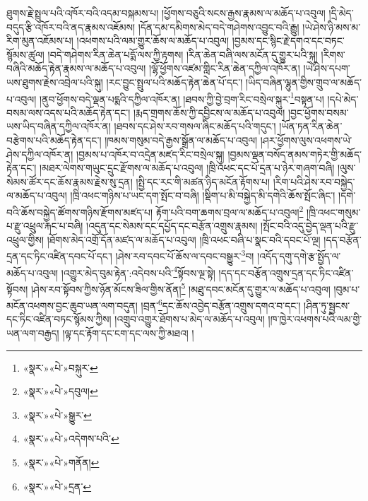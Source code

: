 ཐུགས་རྗེ་སྤྲུལ་པའི་འཁོར་བའི་འདམ་བསྐམས་པ། །ཕྱོགས་བཅུའི་སངས་རྒྱས་རྣམས་ལ་མཆོད་པ་འབུལ། །དྲི་མེད་བདུད་རྩི་འཁོར་བའི་ནད་རྣམས་འཇོམས། །དོན་དམ་དམིགས་མེད་བདེ་གཤེགས་འབྱུང་བའི་རྒྱུ། །ཡེ་ཤེས་ཉི་མས་མ་རིག་མུན་འཇོམས་པ། །འཕགས་པའི་ལམ་གྱུར་ཆོས་ལ་མཆོད་པ་འབུལ། །བྱམས་དང་སྙིང་རྗེ་དགའ་དང་བཏང་སྙོམས་ཚུལ། །བདེ་གཤེགས་རིན་ཆེན་པདྨོ་ལས་ཀྱི་རྟགས། །རིན་ཆེན་བཞི་ལས་མངོན་དུ་གྱུར་པའི་སྐུ། །རིགས་བཞིའི་མཆོད་རྟེན་རྣམས་ལ་མཆོད་པ་འབུལ། །ལྷོ་ཕྱོགས་འཛམ་གླིང་རིན་ཆེན་དཀྱིལ་འཁོར་ན། །ཡེ་ཤེས་དཔག་ཡས་ཐུགས་རྗེས་འབྲེལ་པའི་སྐུ། །རང་བྱུང་སྤྲུལ་པའི་མཆོད་རྟེན་ཆེན་པོ་དང་། །ཡིད་བཞིན་ལྷུན་གྱིས་གྲུབ་ལ་མཆོད་པ་འབུལ། །ནུབ་ཕྱོགས་བདེ་ལྡན་པདྨའི་དཀྱིལ་འཁོར་ན། །ཐབས་ཀྱི་བྱེ་བྲག་རིང་བསྲེལ་སྐུར་\footnote{«སྣར་»«པེ་»བསྐུར་}བསྟན་པ། །དཔེ་མེད་བསམ་ལས་འདས་པའི་མཆོད་རྟེན་དང་། །རྨད་གྲགས་ཆོས་ཀྱི་དབྱིངས་ལ་མཆོད་པ་འབུལ། །བྱང་ཕྱོགས་བསམ་ཡས་ཡིད་བཞིན་དཀྱིལ་འཁོར་ན། །ཐབས་དང་ཤེས་རབ་གསལ་ཞིང་མཆོད་པའི་གདུང་། །ཡོན་ཏན་རིན་ཆེན་བརྩེགས་པའི་མཆོད་རྟེན་དང་། །ཁམས་གསུམ་བདེ་རྒྱས་སྒྲོན་ལ་མཆོད་པ་འབུལ། །ཤར་ཕྱོགས་ལུས་འཕགས་ཡེ་ཤེས་དཀྱིལ་འཁོར་ན། །བྱམས་པ་འཁོར་བ་འདྲེན་མཛད་རིང་བསྲེལ་སྐུ། །བྱམས་ལྡན་བསོད་ནམས་གཏེར་གྱི་མཆོད་རྟེན་དང་། །མཐར་ལེགས་གཡུང་དྲུང་རྫོགས་ལ་མཆོད་པ་འབུལ། །ཁྲི་འཕང་དང་པོ་དྲན་པ་ཉེར་གཞག་བཞི། །ལུས་སེམས་ཚོར་དང་ཆོས་རྣམས་རྗེས་སུ་དྲན། །སྤྱི་དང་རང་གི་མཚན་ཉིད་མངོན་རྟོགས་པ། །རིག་པའི་ཤེས་རབ་བསྐྱེད་ལ་མཆོད་པ་འབུལ། །ཁྲི་འཕང་གཉིས་པ་ཡང་དག་སྤོང་བ་བཞི། །སྡིག་པ་མི་བསྐྱེད་མི་དགེའི་ཆོས་སྤོང་ཞིང་། །དགེ་བའི་ཆོས་བསྐྱེད་ཚོགས་གཉིས་རྫོགས་མཛད་པ། རྟོག་པའི་བག་ཆགས་བྲལ་ལ་མཆོད་པ་འབུལ།\footnote{«སྣར་»«པེ་»དབུལ།} །ཁྲི་འཕང་གསུམ་པ་རྫུ་འཕྲུལ་རྐང་པ་བཞི། །འདུན་དང་སེམས་དང་དཔྱོད་དང་བརྩོན་འགྲུས་རྣམས། །སྤོང་བའི་འདུ་བྱེད་ལྡན་པའི་རྫུ་འཕྲུལ་གྱིས། །ཐོགས་མེད་འགྲོ་དོན་མཛད་ལ་མཆོད་པ་འབུལ། །ཁྲི་འཕང་བཞི་པ་སྣང་བའི་དབང་པོ་ལྔ། །དད་བརྩོན་དྲན་དང་ཏིང་འཛིན་དབང་པོ་དང་། །ཤེས་རབ་དབང་པོ་ཆོས་ལ་དབང་བསྒྱུར་\footnote{«སྣར་»«པེ་»སྒྱུར་}བ། །འདོད་དགུ་དགེ་རྩ་སྤྱོད་ལ་མཆོད་པ་འབུལ། །འགྱུར་མེད་བུམ་རྟེན་:འདེབས་པའི་\footnote{«སྣར་»«པེ་»འདེགས་པའི་}སྟོབས་ལྔ་སྟེ། །དད་དང་བརྩོན་འགྲུས་དྲན་དང་ཏིང་འཛིན་སྟོབས། །ཤེས་རབ་སྟོབས་ཀྱིས་ཉོན་མོངས་ཟིལ་གྱིས་ནོན།\footnote{«སྣར་»«པེ་»གནོན།} །མཐུ་དབང་མངོན་དུ་གྱུར་ལ་མཆོད་པ་འབུལ། །བུམ་པ་མངོན་འཕགས་བྱང་ཆུབ་ཡན་ལག་བདུན། །བྲན་\footnote{«སྣར་»«པེ་»དྲན་}དང་ཆོས་འབྱེད་བརྩོན་འགྲུས་དགའ་བ་དང་། །ཤིན་ཏུ་སྦྱངས་དང་ཏིང་འཛིན་བཏང་སྙོམས་ཀྱིས། །འགྲུབ་འགྱུར་ཐོགས་པ་མེད་ལ་མཆོད་པ་འབུལ། །ཁ་ཁྱེར་འཕགས་པའི་ལམ་གྱི་ཡན་ལག་བརྒྱད། །ལྟ་དང་རྟོག་དང་ངག་དང་ལས་ཀྱི་མཐའ། །
